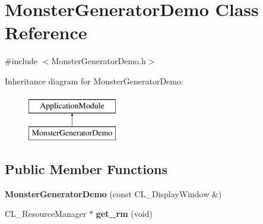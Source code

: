 \hypertarget{classMonsterGeneratorDemo}{
\section{MonsterGeneratorDemo Class Reference}
\label{classMonsterGeneratorDemo}
}


{\ttfamily \#include $<$MonsterGeneratorDemo.h$>$}

Inheritance diagram for MonsterGeneratorDemo:\begin{figure}[H]
\begin{center}
\leavevmode
\includegraphics[height=2cm]{classMonsterGeneratorDemo}
\end{center}
\end{figure}
\subsection*{Public Member Functions}
\begin{DoxyCompactItemize}
\item 
\hypertarget{classMonsterGeneratorDemo_a9b2e81516e469825a83fa54586641dbb}{
{\bfseries MonsterGeneratorDemo} (const CL\_\-DisplayWindow \&)}
\label{classMonsterGeneratorDemo_a9b2e81516e469825a83fa54586641dbb}

\item 
\hypertarget{classMonsterGeneratorDemo_a375c1a42ba5cbae38ce983e238d0ce03}{
CL\_\-ResourceManager $\ast$ {\bfseries get\_\-rm} (void)}
\label{classMonsterGeneratorDemo_a375c1a42ba5cbae38ce983e238d0ce03}

\end{DoxyCompactItemize}
